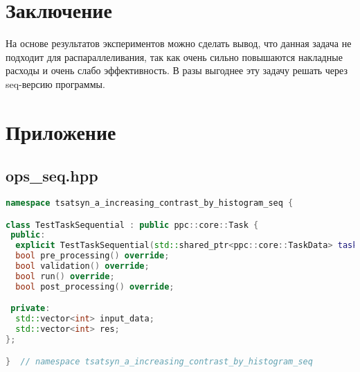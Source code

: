 \documentclass[a4paper,12pt]{article}
\begin{document}
\section{Заключение}
На основе результатов экспериментов можно сделать вывод, что данная задача не подходит для распараллеливания, так как очень сильно повышаются накладные расходы и очень слабо эффективность. В разы выгоднее эту задачу решать через seq-версию программы.
\newpage

\section{Приложение}



\subsection{ops\_seq.hpp}
\begin{lstlisting}[language=C++]
namespace tsatsyn_a_increasing_contrast_by_histogram_seq {

class TestTaskSequential : public ppc::core::Task {
 public:
  explicit TestTaskSequential(std::shared_ptr<ppc::core::TaskData> taskData_) : Task(std::move(taskData_)) {}
  bool pre_processing() override;
  bool validation() override;
  bool run() override;
  bool post_processing() override;

 private:
  std::vector<int> input_data;
  std::vector<int> res;
};

}  // namespace tsatsyn_a_increasing_contrast_by_histogram_seq
\end{lstlisting}
\end{document}
